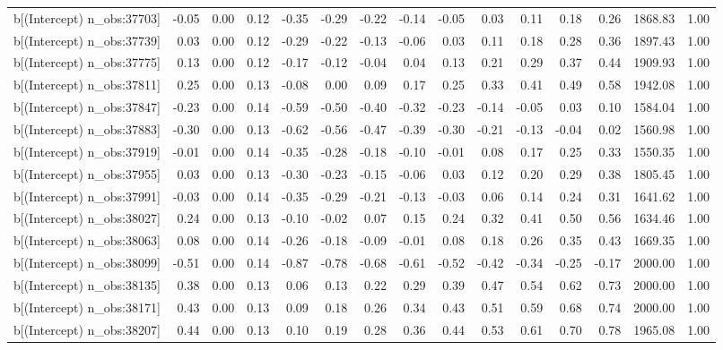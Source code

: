\begin{table}[ht]
\begin{tabular}{rrrrrrrrrrrrrrr}
  b[(Intercept) n\_obs:37703] & -0.05 & 0.00 & 0.12 & -0.35 & -0.29 & -0.22 & -0.14 & -0.05 & 0.03 & 0.11 & 0.18 & 0.26 & 1868.83 & 1.00 \\ 
  b[(Intercept) n\_obs:37739] & 0.03 & 0.00 & 0.12 & -0.29 & -0.22 & -0.13 & -0.06 & 0.03 & 0.11 & 0.18 & 0.28 & 0.36 & 1897.43 & 1.00 \\ 
  b[(Intercept) n\_obs:37775] & 0.13 & 0.00 & 0.12 & -0.17 & -0.12 & -0.04 & 0.04 & 0.13 & 0.21 & 0.29 & 0.37 & 0.44 & 1909.93 & 1.00 \\ 
  b[(Intercept) n\_obs:37811] & 0.25 & 0.00 & 0.13 & -0.08 & 0.00 & 0.09 & 0.17 & 0.25 & 0.33 & 0.41 & 0.49 & 0.58 & 1942.08 & 1.00 \\ 
  b[(Intercept) n\_obs:37847] & -0.23 & 0.00 & 0.14 & -0.59 & -0.50 & -0.40 & -0.32 & -0.23 & -0.14 & -0.05 & 0.03 & 0.10 & 1584.04 & 1.00 \\ 
  b[(Intercept) n\_obs:37883] & -0.30 & 0.00 & 0.13 & -0.62 & -0.56 & -0.47 & -0.39 & -0.30 & -0.21 & -0.13 & -0.04 & 0.02 & 1560.98 & 1.00 \\ 
  b[(Intercept) n\_obs:37919] & -0.01 & 0.00 & 0.14 & -0.35 & -0.28 & -0.18 & -0.10 & -0.01 & 0.08 & 0.17 & 0.25 & 0.33 & 1550.35 & 1.00 \\ 
  b[(Intercept) n\_obs:37955] & 0.03 & 0.00 & 0.13 & -0.30 & -0.23 & -0.15 & -0.06 & 0.03 & 0.12 & 0.20 & 0.29 & 0.38 & 1805.45 & 1.00 \\ 
  b[(Intercept) n\_obs:37991] & -0.03 & 0.00 & 0.14 & -0.35 & -0.29 & -0.21 & -0.13 & -0.03 & 0.06 & 0.14 & 0.24 & 0.31 & 1641.62 & 1.00 \\ 
  b[(Intercept) n\_obs:38027] & 0.24 & 0.00 & 0.13 & -0.10 & -0.02 & 0.07 & 0.15 & 0.24 & 0.32 & 0.41 & 0.50 & 0.56 & 1634.46 & 1.00 \\ 
  b[(Intercept) n\_obs:38063] & 0.08 & 0.00 & 0.14 & -0.26 & -0.18 & -0.09 & -0.01 & 0.08 & 0.18 & 0.26 & 0.35 & 0.43 & 1669.35 & 1.00 \\ 
  b[(Intercept) n\_obs:38099] & -0.51 & 0.00 & 0.14 & -0.87 & -0.78 & -0.68 & -0.61 & -0.52 & -0.42 & -0.34 & -0.25 & -0.17 & 2000.00 & 1.00 \\ 
  b[(Intercept) n\_obs:38135] & 0.38 & 0.00 & 0.13 & 0.06 & 0.13 & 0.22 & 0.29 & 0.39 & 0.47 & 0.54 & 0.62 & 0.73 & 2000.00 & 1.00 \\ 
  b[(Intercept) n\_obs:38171] & 0.43 & 0.00 & 0.13 & 0.09 & 0.18 & 0.26 & 0.34 & 0.43 & 0.51 & 0.59 & 0.68 & 0.74 & 2000.00 & 1.00 \\ 
  b[(Intercept) n\_obs:38207] & 0.44 & 0.00 & 0.13 & 0.10 & 0.19 & 0.28 & 0.36 & 0.44 & 0.53 & 0.61 & 0.70 & 0.78 & 1965.08 & 1.00 \\ 

\end{tabular}
\end{table}
